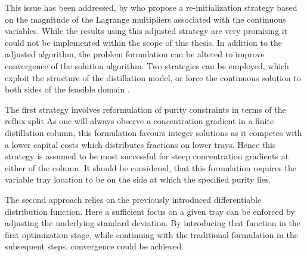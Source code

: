         This issue has been addressed, by \cite{Kraemer.2010} who propose a re-initialization strategy based on the magnitude of
        the Lagrange multipliers associated with the continuous variables. While the results using this adjusted strategy
        are very promising it could not be implemented within the scope of this thesis. In addition to the adjusted algorithm,
        the problem formulation can be altered to improve convergence of the solution algorithm. Two strategies can
        be employed, which exploit the structure of the distillation model, or force the continuous solution to both sides
        of the feasible domain \cite{Kraemer.2009}.

        The first strategy involves reformulation of purity constraints in terms of the reflux split
        As one will always observe a concentration gradient in a finite distillation column, this formulation favours
        integer solutions as it competes with a lower capital costs which distributes fractions on lower trays. Hence
        this strategy is assumed to be most successful for steep concentration gradients at either of the column.
        It should be considered, that this formulation requires the variable tray location to be on the side at which
        the specified purity lies. 

        The second approach relies on the previously introduced differentiable distribution function. Here a sufficient
        focus on a given tray can be enforced by adjusting the underlying standard deviation. By introducing that function
        in the first optimization stage, while continuing with the traditional formulation in the subsequent steps,
        convergence could be achieved.

